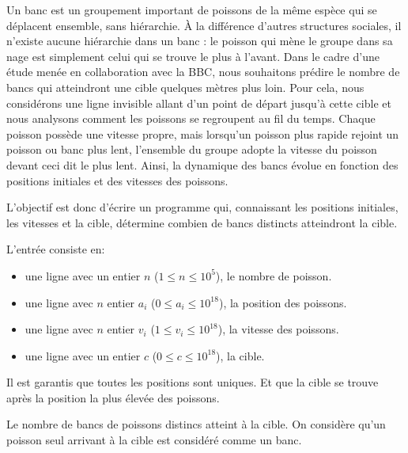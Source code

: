 \problemname{}


Un banc est un groupement important de poissons de la même espèce qui se déplacent ensemble, sans hiérarchie. À la différence d'autres structures sociales, il n'existe aucune hiérarchie dans un banc : le poisson qui mène le groupe dans sa nage est simplement celui qui se trouve le plus à l'avant.
Dans le cadre d'une étude menée en collaboration avec la BBC, nous souhaitons prédire le nombre de bancs qui atteindront une cible quelques mètres plus loin.
Pour cela, nous considérons une ligne invisible allant d'un point de départ jusqu'à cette cible et nous analysons comment les poissons se regroupent au fil du temps.
Chaque poisson possède une vitesse propre, mais lorsqu'un poisson plus rapide rejoint un poisson ou banc plus lent, l'ensemble du groupe adopte la vitesse du poisson devant ceci dit le plus lent.
Ainsi, la dynamique des bancs évolue en fonction des positions initiales et des vitesses des poissons.

L'objectif est donc d'écrire un programme qui, connaissant les positions initiales, les vitesses et la cible, détermine combien de bancs distincts atteindront la cible.

\begin{Input}
    L'entrée consiste en:
    \begin{itemize}
        \item une ligne avec un entier $n$ ($1 \leq n \leq 10^{5}$), le nombre de poisson.
        \item une ligne avec $n$ entier $a_i$ ($0 \leq a_i \leq 10^{18}$), la position des poissons.
        \item une ligne avec $n$ entier $v_i$ ($1 \leq v_i \leq 10^{18}$), la vitesse des poissons.
        \item une ligne avec un entier $c$ ($0 \leq c \leq 10^{18}$), la cible.
    \end{itemize}
    Il est garantis que toutes les positions sont uniques. Et que la cible se trouve après la position la plus élevée des poissons.
\end{Input}

\begin{Output}
   Le nombre de bancs de poissons distincs atteint à la cible. On considère qu'un poisson seul arrivant à la cible est considéré comme un banc.
\end{Output}
